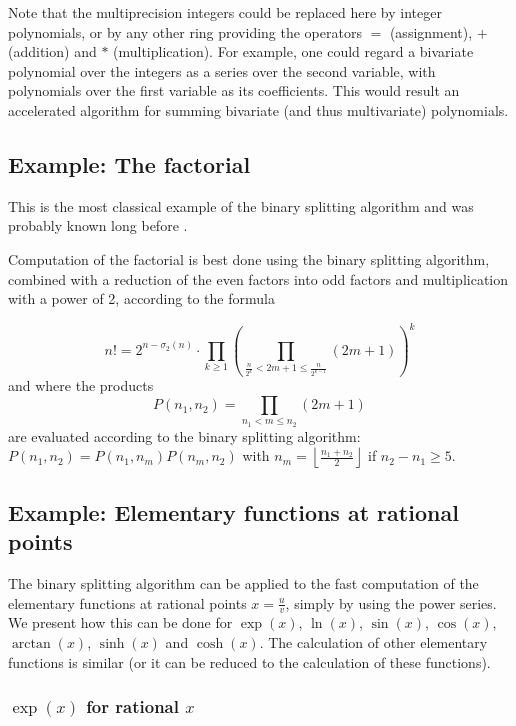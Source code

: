 Note that the multiprecision integers could be replaced here by integer
polynomials, or by any other ring providing the operators \( = \) (assignment),
\( + \) (addition) and \( * \) (multiplication). For example, one could regard
a bivariate polynomial over the integers as a series over the second variable,
with polynomials over the first variable as its coefficients. This would result
an accelerated algorithm for summing bivariate (and thus multivariate)
polynomials.

\subsection{Example: The factorial}

This is the most classical example of the binary splitting algorithm and was
probably known long before \cite{87}.

Computation of the factorial is best done using the binary splitting algorithm,
combined with a reduction of the even factors into odd factors and
multiplication with a power of 2, according to the formula

\[
n!=2^{n-\sigma _{2}(n)}\cdot \prod _{k\geq 1}
\left( \prod _{\frac{n}{2^{k}}<2m+1\leq \frac{n}{2^{k-1}}}(2m+1)\right) ^{k}\]
and where the products 
\[
P(n_{1},n_{2})=\prod _{n_{1}<m\leq n_{2}}(2m+1)\]
are evaluated according to the binary splitting algorithm:
\( P(n_{1},n_{2})=P(n_{1},n_{m})P(n_{m},n_{2}) \) with  
\( n_{m}=\left\lfloor \frac{n_{1}+n_{2}}{2}\right\rfloor  \) 
if  \( n_{2}-n_{1}\geq 5 \).

\subsection{Example: Elementary functions at rational points}

The binary splitting algorithm can be applied to the fast computation of the
elementary functions at rational points  \( x=\frac{u}{v} \), simply 
by using the power series. We present how this can be done for
\( \exp (x) \), \( \ln (x) \), \( \sin (x) \), \( \cos (x) \),
\( \arctan (x) \), \( \sinh (x) \) and \( \cosh (x) \). The calculation
of other elementary functions is similar (or it can be reduced to the
calculation of these functions).


\subsubsection{\( \exp (x) \) for rational \( x \)}

